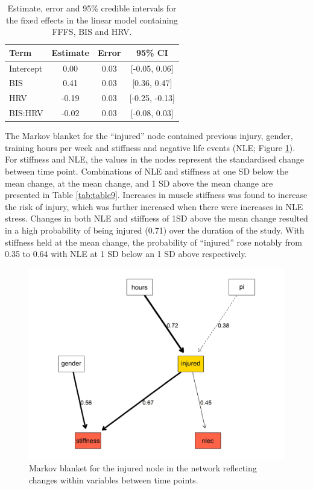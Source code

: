 \documentclass[
  english,
  man]{apa6}
\begin{document}
\begin{table}[H]

\caption{\label{tab:table8}Estimate, error and 95\% credible intervals for the fixed effects in the linear model containing FFFS, BIS and HRV.}
\centering
\begin{tabular}[t]{l|c|c|c}
\hline
\textbf{Term} & \textbf{Estimate} & \textbf{Error} & \textbf{95\% CI}\\
\hline
Intercept & 0.00 & 0.03 & [-0.05, 0.06]\\
\hline
BIS & 0.41 & 0.03 & [0.36, 0.47]\\
\hline
HRV & -0.19 & 0.03 & [-0.25, -0.13]\\
\hline
BIS:HRV & -0.02 & 0.03 & [-0.08, 0.03]\\
\hline
\end{tabular}
\end{table}

The Markov blanket for the ``injured'' node contained previous injury, gender, training hours per week and stiffness and negative life events (NLE; Figure \ref{fig:fig5}).
For stiffness and NLE, the values in the nodes represent the standardised change between time point.
Combinations of NLE and stiffness at one SD below the mean change, at the mean change, and 1 SD above the mean change are presented in Table \ref{tab:table9}.
Increases in muscle stiffness was found to increase the risk of injury, which was further increased when there were increases in NLE stress.
Changes in both NLE and stiffness of 1SD above the mean change resulted in a high probability of being injured (0.71) over the duration of the study.
With stiffness held at the mean change, the probability of ``injured'' rose notably from 0.35 to 0.64 with NLE at 1 SD below an 1 SD above respectively.

\begin{figure}

{\centering \includegraphics[width=1\linewidth]{figures_doc/Fig5} 

}

\caption{Markov blanket for the injured node in the network reflecting changes within variables between time points.}\label{fig:fig5}
\end{figure}
\end{document}
